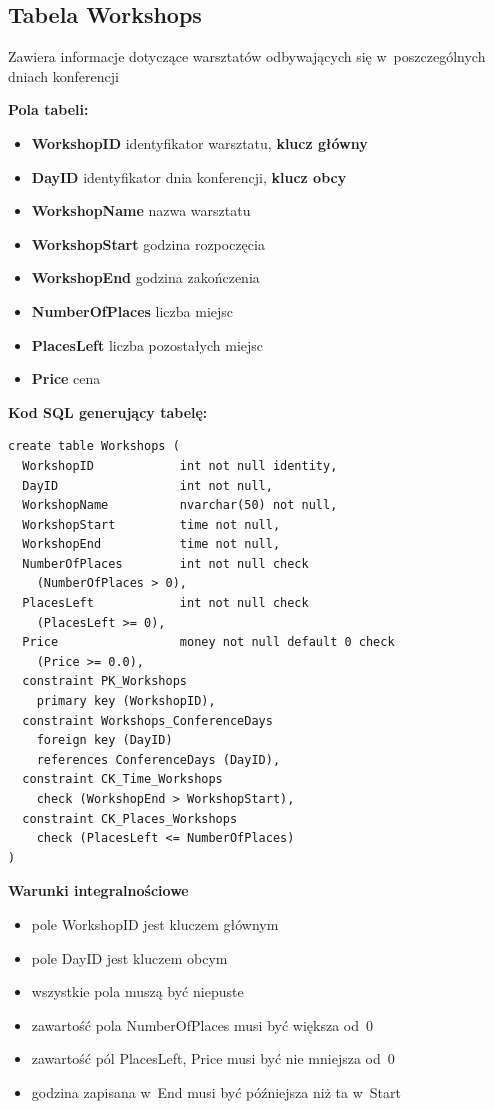 \documentclass[12pt, a4paper]{mwrep}
\begin{document}
\subsection{Tabela Workshops}

\noindent Zawiera informacje dotyczące warsztatów odbywających się w~poszczególnych dniach konferencji

\vspace{0.5cm}

\noindent \textbf{Pola tabeli:}
\begin{itemize}
  \item \textbf{WorkshopID} \ppauza identyfikator warsztatu, \textbf{klucz główny}
  \item \textbf{DayID} \ppauza identyfikator dnia konferencji, \textbf{klucz obcy}
  \item \textbf{WorkshopName} \ppauza nazwa warsztatu
  \item \textbf{WorkshopStart} \ppauza godzina rozpoczęcia
  \item \textbf{WorkshopEnd} \ppauza godzina zakończenia
  \item \textbf{NumberOfPlaces} \ppauza liczba miejsc
  \item \textbf{PlacesLeft} \ppauza liczba pozostałych miejsc
  \item \textbf{Price} \ppauza cena
\end{itemize}

\vspace{0.5cm}
\noindent \textbf{Kod SQL generujący tabelę:}

\begin{lstlisting}
create table Workshops (
  WorkshopID            int not null identity,
  DayID                 int not null,
  WorkshopName          nvarchar(50) not null,
  WorkshopStart         time not null,
  WorkshopEnd           time not null,
  NumberOfPlaces        int not null check
    (NumberOfPlaces > 0),
  PlacesLeft            int not null check
    (PlacesLeft >= 0),
  Price                 money not null default 0 check
    (Price >= 0.0),
  constraint PK_Workshops
    primary key (WorkshopID),
  constraint Workshops_ConferenceDays 
    foreign key (DayID) 
    references ConferenceDays (DayID),
  constraint CK_Time_Workshops 
    check (WorkshopEnd > WorkshopStart),
  constraint CK_Places_Workshops 
    check (PlacesLeft <= NumberOfPlaces)
)
\end{lstlisting}

\vspace{0.5cm}
\noindent \textbf{Warunki integralnościowe}
\begin{itemize}
  \item pole WorkshopID jest kluczem głównym
  \item pole DayID jest kluczem obcym
  \item wszystkie pola muszą być niepuste
  \item zawartość pola NumberOfPlaces musi być większa od~0
  \item zawartość pól PlacesLeft, Price musi być nie mniejsza od~0
  \item godzina zapisana w~End musi być późniejsza niż ta w~Start
\end{itemize}
\end{document}
